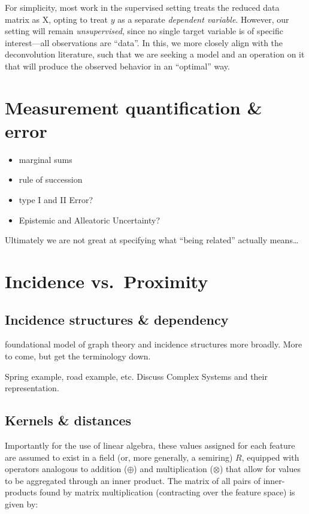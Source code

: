 \documentclass[%
	12pt,
		oneside,
		letterpaper
]{book}
\providecommand{\tightlist}{%
  \setlength{\itemsep}{0pt}\setlength{\parskip}{0pt}}\usepackage{longtable,booktabs,array}
\begin{document}
For simplicity, most work in the supervised setting treats the reduced
data matrix as X, opting to treat \(y\) as a separate \emph{dependent
variable}. However, our setting will remain \emph{unsupervised}, since
no single target variable is of specific interest---all observations are
``data''. In this, we more closely align with the deconvolution
literature, such that we are seeking a model and an operation on it that
will produce the observed behavior in an ``optimal'' way.

\section{Measurement quantification \&
error}\label{measurement-quantification-error}

\begin{itemize}
\tightlist
\item
  marginal sums
\item
  rule of succession
\item
  type I and II Error?
\item
  Epistemic and Alleatoric Uncertainty?
\end{itemize}

Ultimately we are not great at specifying what ``being related''
actually means\ldots{}

\section{Incidence vs.~Proximity}\label{incidence-vs.-proximity}

\subsection{Incidence structures \&
dependency}\label{incidence-structures-dependency}

foundational model of graph theory and incidence structures more
broadly. More to come, but get the terminology down.

Spring example, road example, etc. Discuss Complex Systems and their
representation.

\subsection{Kernels \& distances}\label{kernels-distances}

Importantly for the use of linear algebra, these values assigned for
each feature are assumed to exist in a field (or, more generally, a
semiring) \(R\), equipped with operators analogous to addition
(\(\oplus\)) and multiplication (\(\otimes\)) that allow for values to
be aggregated through an inner product. The matrix of all pairs of
inner-products found by matrix multiplication (contracting over the
feature space) is given by:
\end{document}
